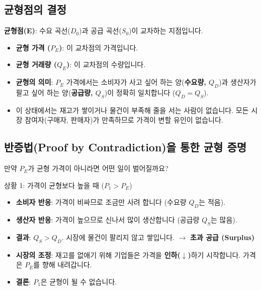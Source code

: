 \documentclass[11pt,a4paper]{article}
\theoremstyle{definition}
\begin{document}
\subsection{균형점의 결정}

\textbf{균형점(E)}: 수요 곡선($D_0$)과 공급 곡선($S_0$)이 교차하는 지점입니다.

\begin{itemize}
    \item \textbf{균형 가격 ($P_E$)}: 이 교차점의 가격입니다.
    \item \textbf{균형 거래량 ($Q_E$)}: 이 교차점의 수량입니다.
    \item \textbf{균형의 의미}: $P_E$ 가격에서는 소비자가 사고 싶어 하는 양(\textbf{수요량, $Q_D$})과 생산자가 팔고 싶어 하는 양(\textbf{공급량, $Q_S$})이 정확히 일치합니다 ($Q_D = Q_S$).
    \item 이 상태에서는 재고가 쌓이거나 물건이 부족해 줄을 서는 사람이 없습니다. 모든 시장 참여자(구매자, 판매자)가 만족하므로 가격이 변할 유인이 없습니다.
\end{itemize}

\subsection{반증법(Proof by Contradiction)을 통한 균형 증명}

만약 $P_E$가 균형 가격이 아니라면 어떤 일이 벌어질까요?

\begin{mybox}{상황 1: 가격이 균형보다 높을 때 ($P_1 > P_E$)}
    \begin{itemize}
        \item \textbf{소비자 반응}: 가격이 비싸므로 조금만 사려 합니다 (수요량 $Q_D$는 적음).
        \item \textbf{생산자 반응}: 가격이 높으므로 신나서 많이 생산합니다 (공급량 $Q_S$는 많음).
        \item \textbf{결과}: $Q_S > Q_D$. 시장에 물건이 팔리지 않고 쌓입니다. $\rightarrow$ \textbf{초과 공급 (Surplus)}
        \item \textbf{시장의 조정}: 재고를 없애기 위해 기업들은 가격을 \textbf{인하($\downarrow$)}하기 시작합니다. 가격은 $P_E$를 향해 내려갑니다.
        \item \textbf{결론}: $P_1$은 균형이 될 수 없습니다.
    \end{itemize}
\end{mybox}
\end{document}
